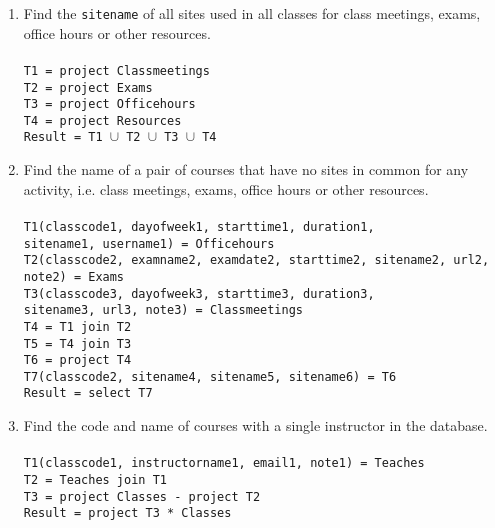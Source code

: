 \documentclass[11pt]{article}
\begin{document}
\begin{enumerate} [label=\Alph*]
\item Find the {\tt sitename} of all sites used in all classes for
  class meetings, exams, office hours or other resources.\\\\
\texttt{T1 = project Classmeetings} \\
\texttt{T2 = project Exams} \\
\texttt{T3 = project Officehours} \\
\texttt{T4 = project Resources} \\
\texttt{Result = T1 $\cup$ T2 $\cup$ T3 $\cup$ T4}


\item Find the name of a pair of courses that have no sites in common
  for any activity, i.e. class meetings, exams, office hours or other
  resources. \\\\
 \texttt{T1(classcode1, dayofweek1, starttime1, duration1, \\sitename1, username1) = Officehours} \\
 \texttt{T2(classcode2, examname2, examdate2, starttime2, sitename2, url2, note2) = Exams} \\
 \texttt{T3(classcode3, dayofweek3, starttime3, duration3, \\sitename3, url3, note3) = Classmeetings} \\
 \texttt{T4 = T1 join T2}  \\
 \texttt{T5 = T4 join T3}  \\
 \texttt{T6 = project T4} \\
 \texttt{T7(classcode2, sitename4, sitename5, sitename6) = T6} \\ 
 \texttt{Result = select T7}
 
\item Find the code and name of courses with a single instructor in
  the database. \\\\
\texttt{T1(classcode1, instructorname1, email1, note1) = Teaches} \\
\texttt{T2 = Teaches join T1} \\
\texttt{T3 = project Classes  - project T2} \\
\texttt{Result = project T3 * Classes } \\


\end{enumerate}
\end{document}
